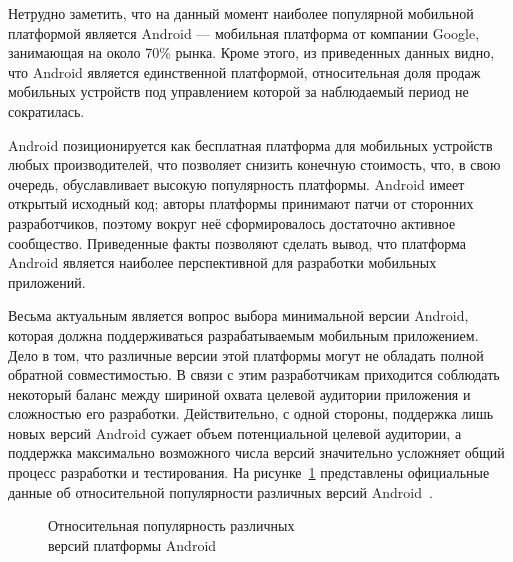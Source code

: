 Нетрудно заметить, что на данный момент наиболее популярной мобильной платформой
является Android --- мобильная платформа от компании Google,
занимающая на около 70\% рынка.
Кроме этого, из приведенных данных видно, что Android является единственной
платформой, относительная доля продаж мобильных устройств под управлением которой
за наблюдаемый период не сократилась.

Android позиционируется как бесплатная платформа для мобильных устройств любых
производителей, что позволяет снизить конечную стоимость, что, в свою очередь,
обуславливает высокую популярность платформы.
Android имеет открытый исходный код; авторы платформы
принимают патчи от сторонних разработчиков,
поэтому вокруг неё сформировалось достаточно активное сообщество.
Приведенные факты позволяют сделать вывод, что платформа Android является наиболее
перспективной для разработки мобильных приложений.

Весьма актуальным является вопрос выбора минимальной версии Android,
которая должна поддерживаться разрабатываемым мобильным приложением.
Дело в том, что различные версии этой платформы могут не обладать
полной обратной совместимостью. В связи с этим разработчикам приходится
соблюдать некоторый баланс между шириной охвата целевой аудитории приложения
и сложностью его разработки.
Действительно, с одной стороны, поддержка лишь новых версий Android сужает объем
потенциальной целевой аудитории, а поддержка максимально возможного числа версий
значительно усложняет общий процесс разработки и тестирования.
На рисунке~\ref{fig:system_spec_stat_android} представлены официальные
данные об относительной популярности различных версий
Android~\cite{google_stat_android}.

\begin{figure}[h!]
  \centering
  \caption{Относительная популярность различных \\ версий платформы Android}
  \label{fig:system_spec_stat_android}
\end{figure}

